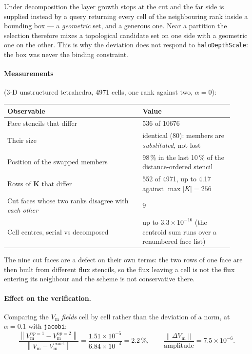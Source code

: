 \documentclass[11pt,a4paper]{article}
\newcommand{\code}[1]{\texttt{\small #1}}
\newcommand{\Vm}{V_{\text{m}}}
\newcommand{\Kstif}{\mathbf{K}}
\newcommand{\norm}[1]{\left\lVert #1 \right\rVert}
\begin{document}
Under decomposition the layer growth stops at the cut and the far side is
supplied instead by a query returning every cell of the neighbouring rank
inside a bounding box --- a \emph{geometric} set, and a generous one. Near a
partition the selection therefore mixes a topological candidate set on one side
with a geometric one on the other. This is why the deviation does not respond
to \code{haloDepthScale}: the box was never the binding constraint.

\paragraph{Measurements} (3-D unstructured tetrahedra, 4971 cells, one rank
against two, $\alpha=0$):

\begin{center}
\begin{tabular}{@{}p{0.55\linewidth}p{0.37\linewidth}@{}}
\toprule
Observable & Value \\
\midrule
Face stencils that differ & 536 of 10676 \\
Their size & identical (80): members are \emph{substituted}, not lost \\
Position of the swapped members & 98\,\% in the last 10\,\% of the
   distance-ordered stencil \\
Rows of $\Kstif$ that differ & 552 of 4971, up to 4.17 against
   $\max|K| = 256$ \\
Cut faces whose two ranks disagree with \emph{each other} & 9 \\
Cell centres, serial vs decomposed & up to $3.3\times10^{-16}$ (the centroid
   sum runs over a renumbered face list) \\
\bottomrule
\end{tabular}
\end{center}

The nine cut faces are a defect on their own terms: the two rows of one face
are then built from different flux stencils, so the flux leaving a cell is not
the flux entering its neighbour and the scheme is not conservative there.

\paragraph{Effect on the verification.} Comparing the $\Vm$ \emph{fields} cell
by cell rather than the deviation of a norm, at $\alpha=0.1$ with
\code{jacobi}:
\[
  \frac{\norm{\Vm^{np=1}-\Vm^{np=2}}}{\norm{\Vm-\Vm^{\text{exact}}}}
  = \frac{1.51\times10^{-5}}{6.84\times10^{-4}} = 2.2\,\%,
  \qquad
  \frac{\norm{\Delta\Vm}}{\text{amplitude}} = 7.5\times10^{-6}.
\]
\end{document}
